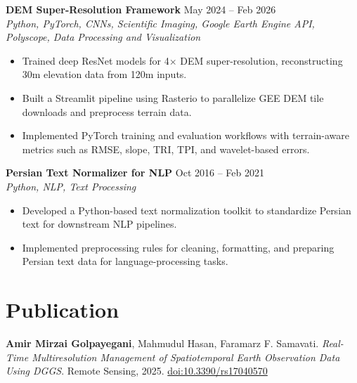\documentclass[a4paper,10pt]{article}
\newcommand{\resumeSubheading}[4]{
    \textbf{#1} \hfill #2 \\
    \textit{#3} \hfill \textit{#4}
}
\begin{document}
\noindent
\textbf{DEM Super-Resolution Framework} \hfill May 2024 -- Feb 2026 \\
\textit{Python, PyTorch, CNNs, Scientific Imaging, Google Earth Engine API, Polyscope, Data Processing and Visualization}
\begin{itemize}[leftmargin=0.25in]
    \item Trained deep ResNet models for 4$\times$ DEM super-resolution, reconstructing 30m elevation data from 120m inputs.
    \item Built a Streamlit pipeline using Rasterio to parallelize GEE DEM tile downloads and preprocess terrain data.
    \item Implemented PyTorch training and evaluation workflows with terrain-aware metrics such as RMSE, slope, TRI, TPI, and wavelet-based errors.
\end{itemize}

\noindent
\textbf{Persian Text Normalizer for NLP} \hfill Oct 2016 -- Feb 2021 \\
\textit{Python, NLP, Text Processing}
\begin{itemize}[leftmargin=0.25in]
    \item Developed a Python-based text normalization toolkit to standardize Persian text for downstream NLP pipelines.
    \item Implemented preprocessing rules for cleaning, formatting, and preparing Persian text data for language-processing tasks.
\end{itemize}

\section*{Publication}

\textbf{Amir Mirzai Golpayegani}, Mahmudul Hasan, Faramarz F. Samavati. 
\textit{Real-Time Multiresolution Management of Spatiotemporal Earth Observation Data Using DGGS}. 
Remote Sensing, 2025. \href{https://doi.org/10.3390/rs17040570}{doi:10.3390/rs17040570}



\end{document}
